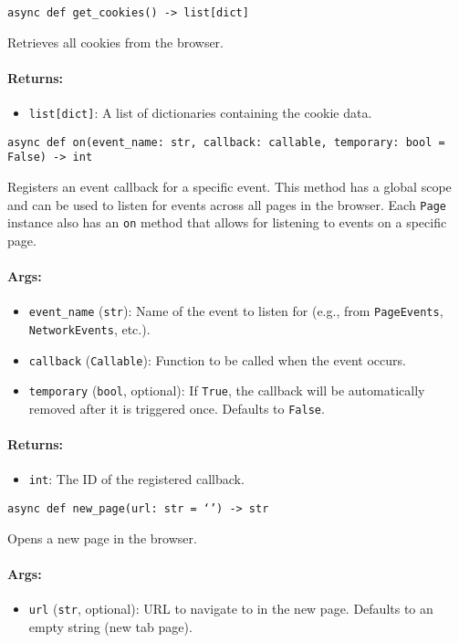 \documentclass{article}
\begin{document}
\noindent\texttt{async def get\_cookies() -> list[dict]}

\noindent Retrieves all cookies from the browser.

\paragraph{Returns:}
\begin{itemize}
    \item \texttt{list[dict]}: A list of dictionaries containing the cookie data.
\end{itemize}

\noindent\texttt{async def on(event\_name: str, callback: callable, temporary: bool = False) -> int}

\noindent Registers an event callback for a specific event. This method has a global scope and can be used to listen for events across all pages in the browser. Each \texttt{Page} instance also has an \texttt{on} method that allows for listening to events on a specific page.

\paragraph{Args:}
\begin{itemize}
    \item \texttt{event\_name} (\texttt{str}): Name of the event to listen for (e.g., from \texttt{PageEvents}, \texttt{NetworkEvents}, etc.).
    \item \texttt{callback} (\texttt{Callable}): Function to be called when the event occurs.
    \item \texttt{temporary} (\texttt{bool}, optional): If \texttt{True}, the callback will be automatically removed after it is triggered once. Defaults to \texttt{False}.
\end{itemize}

\paragraph{Returns:}
\begin{itemize}
    \item \texttt{int}: The ID of the registered callback.
\end{itemize}

\noindent\texttt{async def new\_page(url: str = `') -> str}

\noindent Opens a new page in the browser.

\paragraph{Args:}
\begin{itemize}
    \item \texttt{url} (\texttt{str}, optional): URL to navigate to in the new page. Defaults to an empty string (new tab page).
\end{itemize}
\end{document}
